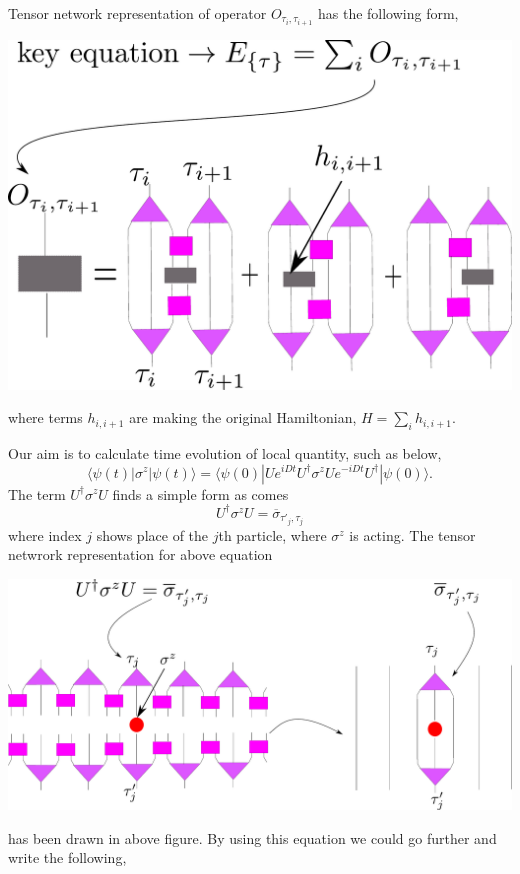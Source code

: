 \documentclass[aps,prb,onecolumn,groupedaddress,notitlepage,showpacs,floatfix,superscriptaddress]{revtex4-1}
\begin{document}
Tensor network representation of operator $O_{\tau_{i}, \tau_{i+1}}$ has the following form,             
\begin{center}
\includegraphics[scale=0.3, angle=0, origin=c]{Rg-MERA}
\end{center}
where terms $h_{i,i+1}$ are making the original Hamiltonian, $H=\sum_{i} h_{i,i+1}$. 


Our aim is to calculate time evolution of local quantity, such as below,
\begin{equation*}
\langle \psi(t) | \sigma^{z} |\psi(t)\rangle=\langle \psi(0)| U e^{iDt} U^{\dagger} \sigma^{z} U e^{-iDt} U^{\dagger}|\psi(0)\rangle.
\end{equation*}
The term $U^{\dagger} \sigma^{z} U$ finds a simple form as comes          
\begin{equation*}
U^{\dagger}\sigma^{z}  U   =\overline{\sigma} _{\tau'_{j},\tau_{j}}
\end{equation*}        
where index $j$ shows place of the $j$th particle, where $\sigma^{z}$ is acting. The tensor netwrork representation for above equation       
\begin{center}
\includegraphics[scale=0.25, angle=0, origin=c]{unitary-local-operator}
\end{center}
has been drawn in above figure. By using this equation we could go further and write the following,
\end{document}
